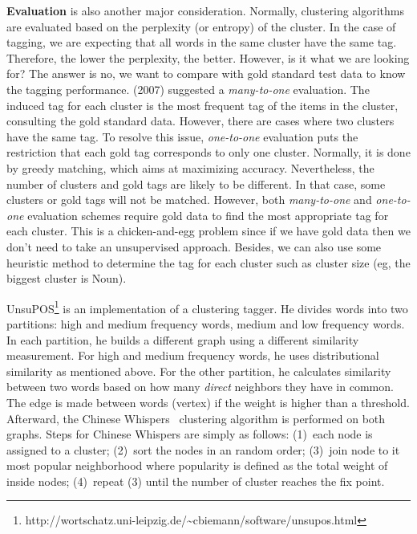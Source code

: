 \textbf{Evaluation} is also another major consideration. Normally, clustering algorithms are evaluated based on the perplexity (or entropy) of the cluster. In the case of tagging, we are expecting that all words in the same cluster have the same tag. Therefore, the lower the perplexity, the better. However, is it what we are looking for? The answer is no, we want to compare with gold standard test data to know the tagging performance. \citeauthor{ManyToOneEvaluate} (2007) suggested a \textit{many-to-one} evaluation. The induced tag for each cluster is the most frequent tag of the items in the cluster, consulting the gold standard data. However, there are cases where two clusters have the same tag. To resolve this issue,\textit{ one-to-one} evaluation puts the restriction that each gold tag corresponds to only one cluster. Normally, it is done by greedy matching, which aims at maximizing  accuracy. Nevertheless, the number of clusters and gold tags are likely to be different. In that case, some clusters or gold tags will not be matched. However, both \textit{many-to-one} and \textit{one-to-one} evaluation schemes require gold data to find the most appropriate tag for each cluster. This is a chicken-and-egg problem since if we have gold data then we don't need to take an unsupervised approach. Besides, we can also use some heuristic method to determine the tag for each cluster such as cluster size (eg, the biggest cluster is Noun). 

UnsuPOS\footnote{http://wortschatz.uni-leipzig.de/\textasciitilde cbiemann/software/unsupos.html} \cite{unSupPOSClustering} is an implementation of a clustering tagger. He divides words into two partitions: high and medium frequency words, medium and low frequency words. In each partition, he builds a different graph using a different similarity measurement. For high and medium frequency words, he uses distributional similarity as mentioned above. For the other partition, he calculates similarity between two words based on how many \textit{direct} neighbors they have in common. The edge is made between words (vertex) if the weight is higher than a threshold. Afterward, the Chinese Whispers~\cite{chineseWhisper} clustering algorithm is performed on both graphs. Steps for Chinese Whispers are simply as follows: (1)~each node is assigned to a cluster; (2)~sort the nodes in an random order; (3)~join node to it most popular neighborhood where popularity is defined as the total weight of inside nodes; (4)~repeat (3) until the number of cluster reaches the fix point. 


